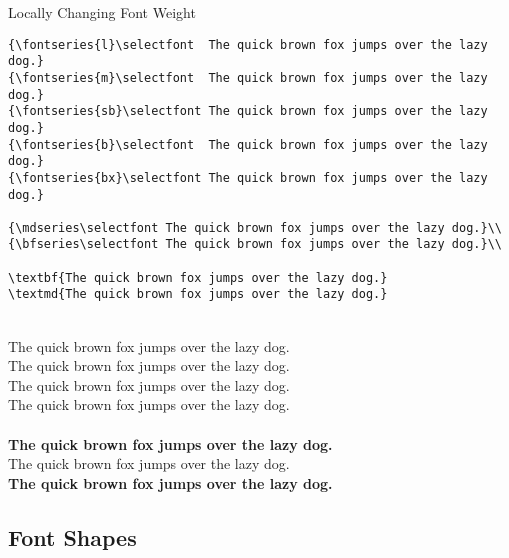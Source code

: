 \documentclass[a4paper,oneside,11pt]{article}
\begin{document}
\begin{titled-frame}
{\textsf{Locally Changing Font Weight}}
\vspace{-1em}
\begin{verbatim}
{\fontseries{l}\selectfont  The quick brown fox jumps over the lazy dog.}
{\fontseries{m}\selectfont  The quick brown fox jumps over the lazy dog.}
{\fontseries{sb}\selectfont The quick brown fox jumps over the lazy dog.}
{\fontseries{b}\selectfont  The quick brown fox jumps over the lazy dog.}
{\fontseries{bx}\selectfont The quick brown fox jumps over the lazy dog.}

{\mdseries\selectfont The quick brown fox jumps over the lazy dog.}\\
{\bfseries\selectfont The quick brown fox jumps over the lazy dog.}\\

\textbf{The quick brown fox jumps over the lazy dog.}
\textmd{The quick brown fox jumps over the lazy dog.}
\end{verbatim}

\\
{\selectfont  The quick brown fox jumps over the lazy dog.}\\
{\selectfont  The quick brown fox jumps over the lazy dog.}\\
{\selectfont  The quick brown fox jumps over the lazy dog.}\\
{\selectfont The quick brown fox jumps over the lazy dog.}\\

\\
{\bfseries\selectfont The quick brown fox jumps over the lazy dog.}\\

\noindent\textmd{The quick brown fox jumps over the lazy dog.}\\
\textbf{The quick brown fox jumps over the lazy dog.}\\
\vspace{-1em}
\end{titled-frame}




\subsection{Font Shapes}
\label{subsec:font-shapes}
\end{document}
